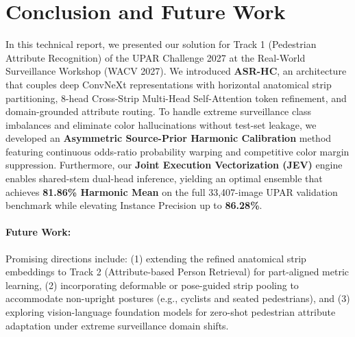\section{Conclusion and Future Work}
\label{sec:conclusion}

In this technical report, we presented our solution for Track 1 (Pedestrian Attribute Recognition) of the UPAR Challenge 2027 at the Real-World Surveillance Workshop (WACV 2027). We introduced \textbf{ASR-HC}, an architecture that couples deep ConvNeXt representations with horizontal anatomical strip partitioning, 8-head Cross-Strip Multi-Head Self-Attention token refinement, and domain-grounded attribute routing. To handle extreme surveillance class imbalances and eliminate color hallucinations without test-set leakage, we developed an \textbf{Asymmetric Source-Prior Harmonic Calibration} method featuring continuous odds-ratio probability warping and competitive color margin suppression. Furthermore, our \textbf{Joint Execution Vectorization (JEV)} engine enables shared-stem dual-head inference, yielding an optimal ensemble that achieves \textbf{81.86\% Harmonic Mean} on the full 33,407-image UPAR validation benchmark while elevating Instance Precision up to \textbf{86.28\%}.

\paragraph{Future Work:} Promising directions include: (1) extending the refined anatomical strip embeddings to Track 2 (Attribute-based Person Retrieval) for part-aligned metric learning, (2) incorporating deformable or pose-guided strip pooling to accommodate non-upright postures (e.g., cyclists and seated pedestrians), and (3) exploring vision-language foundation models for zero-shot pedestrian attribute adaptation under extreme surveillance domain shifts.
